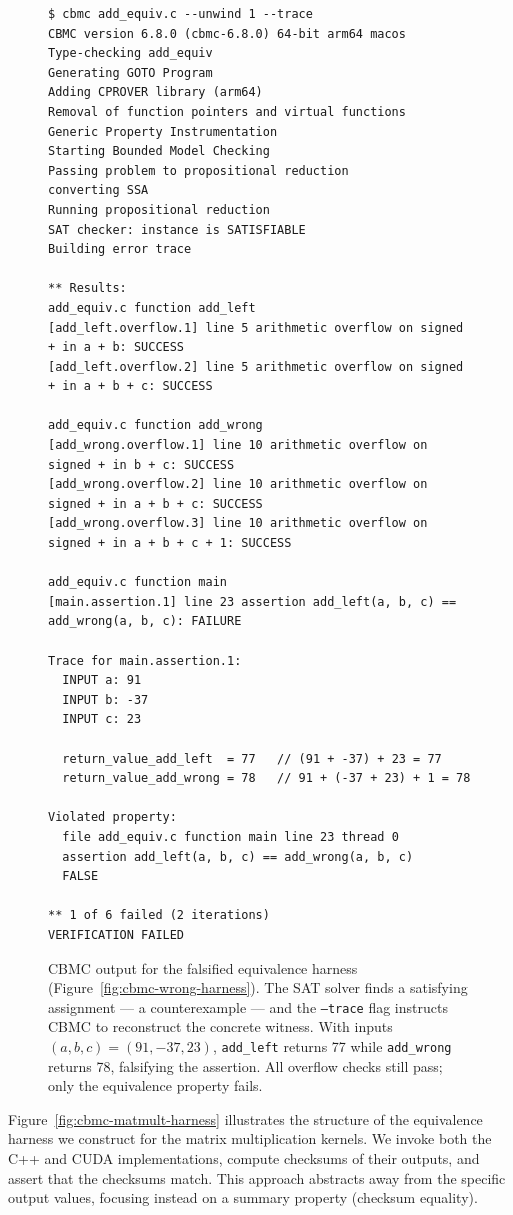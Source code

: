 \documentclass{article}
\begin{document}
\begin{figure}[H]
\begin{verbatim}
$ cbmc add_equiv.c --unwind 1 --trace
CBMC version 6.8.0 (cbmc-6.8.0) 64-bit arm64 macos
Type-checking add_equiv
Generating GOTO Program
Adding CPROVER library (arm64)
Removal of function pointers and virtual functions
Generic Property Instrumentation
Starting Bounded Model Checking
Passing problem to propositional reduction
converting SSA
Running propositional reduction
SAT checker: instance is SATISFIABLE
Building error trace

** Results:
add_equiv.c function add_left
[add_left.overflow.1] line 5 arithmetic overflow on signed + in a + b: SUCCESS
[add_left.overflow.2] line 5 arithmetic overflow on signed + in a + b + c: SUCCESS

add_equiv.c function add_wrong
[add_wrong.overflow.1] line 10 arithmetic overflow on signed + in b + c: SUCCESS
[add_wrong.overflow.2] line 10 arithmetic overflow on signed + in a + b + c: SUCCESS
[add_wrong.overflow.3] line 10 arithmetic overflow on signed + in a + b + c + 1: SUCCESS

add_equiv.c function main
[main.assertion.1] line 23 assertion add_left(a, b, c) == add_wrong(a, b, c): FAILURE

Trace for main.assertion.1:
  INPUT a: 91
  INPUT b: -37
  INPUT c: 23

  return_value_add_left  = 77   // (91 + -37) + 23 = 77
  return_value_add_wrong = 78   // 91 + (-37 + 23) + 1 = 78

Violated property:
  file add_equiv.c function main line 23 thread 0
  assertion add_left(a, b, c) == add_wrong(a, b, c)
  FALSE

** 1 of 6 failed (2 iterations)
VERIFICATION FAILED
\end{verbatim}
\caption{CBMC output for the falsified equivalence harness (Figure~\ref{fig:cbmc-wrong-harness}). The SAT solver finds a satisfying assignment --- a counterexample --- and the \texttt{--trace} flag instructs CBMC to reconstruct the concrete witness. With inputs $(a, b, c) = (91, -37, 23)$, \texttt{add\_left} returns 77 while \texttt{add\_wrong} returns 78, falsifying the assertion. All overflow checks still pass; only the equivalence property fails.}
\label{fig:cbmc-wrong-output}
\end{figure}

Figure~\ref{fig:cbmc-matmult-harness} illustrates the structure of the equivalence harness we construct for the matrix multiplication kernels. We invoke both the C++ and CUDA implementations, compute checksums of their outputs, and assert that the checksums match. This approach abstracts away from the specific output values, focusing instead on a summary property (checksum equality).
\end{document}
